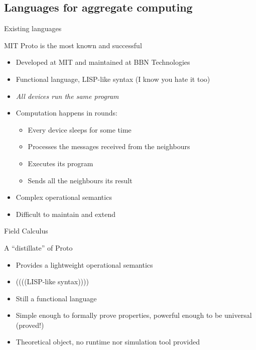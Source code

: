 \documentclass[presentation]{beamer} %
\begin{document}
\subsection{Languages for aggregate computing}

\begin{frame}[fragile]{Existing languages}
  \begin{block} {MIT Proto \cite{beal} is the most known and successful}
   \begin{itemize}
    \item Developed at MIT and maintained at BBN Technologies
    \item Functional language, LISP-like syntax (I know you hate it too)
    \item \emph{All devices run the same program}
    \item Computation happens in rounds:
    \begin{itemize}
      \item Every device sleeps for some time
      \item Processes the messages received from the neighbours
      \item Executes its program
      \item Sends all the neighbours its result
    \end{itemize}
    \item Complex operational semantics
    \item Difficult to maintain and extend 
   \end{itemize}
  \end{block}
\end{frame}

\begin{frame}[fragile]{Field Calculus}
  \begin{block} {A ``distillate'' of Proto}
   \begin{itemize}
    \item Provides a lightweight operational semantics \cite{VDB-FOCLASA-CIC2013}
    \item ((((LISP-like syntax))))
    \item Still a functional language
    \item Simple enough to formally prove properties, powerful enough to be universal (proved!)
    \item Theoretical object, no runtime nor simulation tool provided
   \end{itemize}
  \end{block}
\end{frame}
\end{document}
